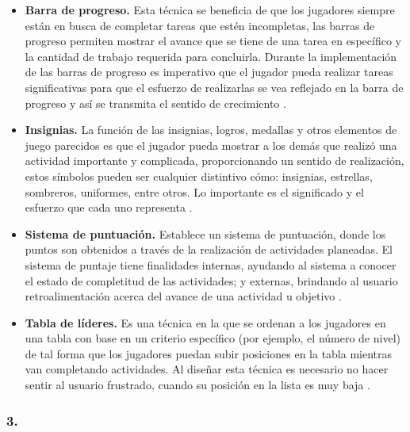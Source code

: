     \begin{itemize}
    \item
    {\bf Barra de progreso.}
        Esta técnica se beneficia de que los jugadores siempre están en busca de completar tareas
        que estén incompletas, las barras de progreso permiten mostrar el avance que se tiene de una
        tarea en específico y la cantidad de trabajo requerida para concluirla. Durante la
        implementación de las barras de progreso es imperativo que el jugador pueda realizar tareas
        significativas para que el esfuerzo de realizarlas se vea reflejado en la barra de progreso
        y así se transmita el sentido de crecimiento \cite[p. 113]{Octalysis}.

    \item
    {\bf Insignias.}
        La función de las insignias, logros, medallas y otros elementos de juego parecidos es que el
        jugador pueda mostrar a los demás que realizó una actividad importante y complicada,
        proporcionando un sentido de realización, estos símbolos pueden ser cualquier distintivo
        cómo: insignias, estrellas, sombreros, uniformes, entre otros. Lo importante es el
        significado y el esfuerzo que cada uno representa \cite[p. 117]{Octalysis}.

    \item
    {\bf Sistema de puntuación.} %
        Establece un sistema de puntuación, donde los puntos son obtenidos a través
        de la realización de actividades planeadas. El sistema de puntaje tiene
        finalidades internas, ayudando al sistema a conocer el estado de completitud
        de las actividades; y externas, brindando al usuario retroalimentación acerca
        del avance de una actividad u objetivo \cite[p. 118]{Octalysis}.

    \item
    {\bf Tabla de líderes.}
        Es una técnica en la que se ordenan a los jugadores en una tabla con base en un criterio
        específico (por ejemplo, el número de nivel) de tal forma que los jugadores puedan subir
        posiciones en la tabla mientras van completando actividades. Al diseñar esta técnica es
        necesario no hacer sentir al usuario frustrado, cuando su posición en la lista es muy baja
        \cite[p. 121]{Octalysis}.
    \end{itemize}


\subsubsection{3. \principioIII} \label{subsec:prinpcioIII}

